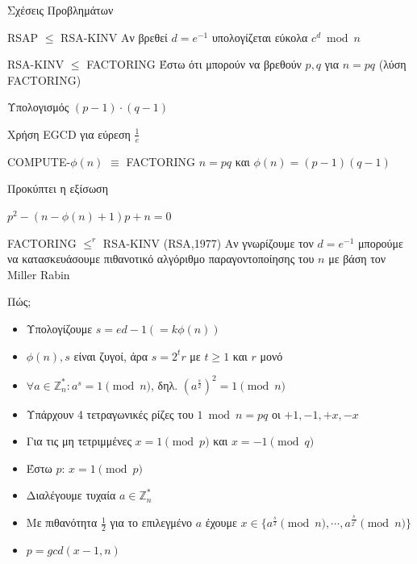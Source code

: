 \documentclass[handout]{beamer}
\begin{document}
\begin{frame}[allowframebreaks]{Σχέσεις Προβλημάτων}

\begin{block}{RSAP $\leq$ RSA-KINV}
Αν βρεθεί $d=e^{-1}$ υπολογίζεται εύκολα $c^d \bmod n$ 
\end{block}

\begin{block}{RSA-KINV $\leq$ FACTORING}
Έστω ότι μπορούν να βρεθούν $p,q$ για $n=pq$ (λύση FACTORING)

Υπολογισμός $(p-1) \cdot (q-1)$

Χρήση EGCD για εύρεση $\frac{1}{e}$
\end{block}

\framebreak

\begin{block}{COMPUTE-$\phi(n)$ $\equiv$ FACTORING}
$n=pq$ και $\phi(n) = (p-1)(q-1)$

Προκύπτει η εξίσωση 

$p^2 - (n- \phi(n) +1)p + n=0$
\end{block}

\begin{block}{FACTORING $\leq^r$ RSA-KINV (RSA,1977)} 
Αν γνωρίζουμε τον $d=e^{-1}$ μπορούμε να κατασκευάσουμε πιθανοτικό αλγόριθμο παραγοντοποίησης του  $n$ με βάση τον Miller Rabin
\end{block}

\framebreak

Πώς;
\begin{small}
\begin{itemize}
\item Υπολογίζουμε $s = ed -1 (=k\phi(n))$
\item $\phi(n),s$ είναι ζυγοί, άρα $s = 2^tr$ με $t \geq 1$ και $r$ μονό
\item $\forall a \in \mathbb{Z}_n^*: a^s = 1 \pmod n$, δηλ.  $(a^\frac{s}{2})^2 = 1 \pmod n$
\item Υπάρχουν 4 τετραγωνικές ρίζες του $1 \bmod {n=pq}$ οι $+1,-1,+x,-x$
\item Για τις μη τετριμμένες $x=1 \pmod p$ και $x=-1 \pmod q$
\item Έστω $p$: $x=1 \pmod p$
\item Διαλέγουμε τυχαία $a \in \mathbb{Z}_n^*$
\item Με πιθανότητα $\frac{1}{2}$ για το επιλεγμένο $a$ έχουμε $x \in \{a^\frac{s}{2} \pmod{n}, \cdots, a^\frac{s}{2^t} \pmod{n} \}$
\item $p = gcd(x-1,n)$
\end{itemize}
\end{small}
 

\end{frame}
\end{document}
